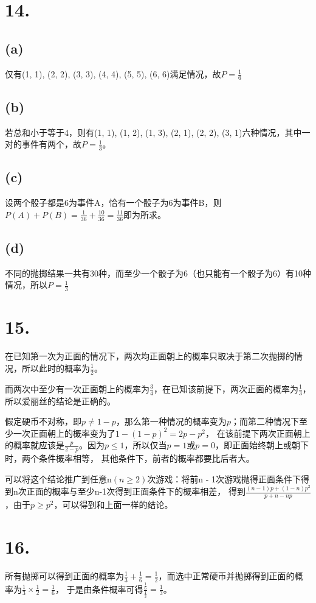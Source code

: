 \documentclass[UTF8]{article}
\begin{document}
    \section*{14.}
        \subsection*{(a)}
            仅有(1, 1), (2, 2), (3, 3), (4, 4), (5, 5), (6, 6)满足情况，故$P = \frac{1}{6}$
        \subsection*{(b)}
            若总和小于等于4，则有(1, 1), (1, 2), (1, 3), (2, 1), (2, 2), (3, 1)六种情况，其中一对的事件有两个，故$P = \frac{1}{3}$。
        \subsection*{(c)}
            设两个骰子都是6为事件A，恰有一个骰子为6为事件B，则$P(A) + P(B) = \frac{1}{36} + \frac{10}{36} = \frac{11}{36}$即为所求。
        \subsection*{(d)}
            不同的抛掷结果一共有30种，而至少一个骰子为6（也只能有一个骰子为6）有10种情况，所以$P = \frac{1}{3}$
    \section*{15.}
        在已知第一次为正面的情况下，两次均正面朝上的概率只取决于第二次抛掷的情况，所以此时的概率为$\frac{1}{2}$。

        而两次中至少有一次正面朝上的概率为$\frac{3}{4}$，在已知该前提下，两次正面的概率为$\frac{1}{3}$，所以爱丽丝的结论是正确的。

        假定硬币不对称，即$p \ne 1 - p$，那么第一种情况的概率变为$p$；而第二种情况下至少一次正面朝上的概率变为了$1 - (1 - p)^2 = 2p - p^2$，
        在该前提下两次正面朝上的概率就应该是$\frac{p}{2 - p}$。因为$p \leq 1$，所以仅当$p = 1$或$p = 0$，即正面始终朝上或朝下时，两个条件概率相等，
        其他条件下，前者的概率都要比后者大。

        可以将这个结论推广到任意n$(n \geq 2)$次游戏：将前n - 1次游戏抛得正面条件下得到n次正面的概率与至少n-1次得到正面条件下的概率相差，
        得到$\frac{(n - 1)p + (1 - n)p^2}{p + n - np}$，由于$p \geq p^2$，可以得到和上面一样的结论。
    \section*{16.}
        所有抛掷可以得到正面的概率为$\frac{1}{3} + \frac{1}{6} = \frac{1}{2}$，而选中正常硬币并抛掷得到正面的概率为$\frac{1}{3} \times \frac{1}{2} = \frac{1}{6}$，
        于是由条件概率可得$\frac{\frac{1}{6}}{\frac{1}{2}} = \frac{1}{3}$。
\end{document}
